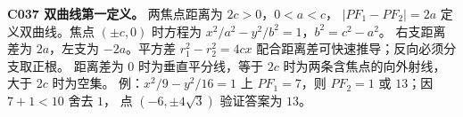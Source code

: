 \textbf{C037 双曲线第一定义。} 两焦点距离为 $2c>0$，$0<a<c$，
$|PF_1-PF_2|=2a$ 定义双曲线。焦点 $(\pm c,0)$ 时方程为 $x^2/a^2-y^2/b^2=1$，$b^2=c^2-a^2$。
右支距离差为 $2a$，左支为 $-2a$。平方差 $r_1^2-r_2^2=4cx$ 配合距离差可快速推导；反向必须分支取正根。
距离差为 $0$ 时为垂直平分线，等于 $2c$ 时为两条含焦点的向外射线，大于 $2c$ 时为空集。
例：$x^2/9-y^2/16=1$ 上 $PF_1=7$，则 $PF_2=1$ 或 $13$；因 $7+1<10$ 舍去 $1$，
点 $(-6,\pm4\sqrt3)$ 验证答案为 $13$。
